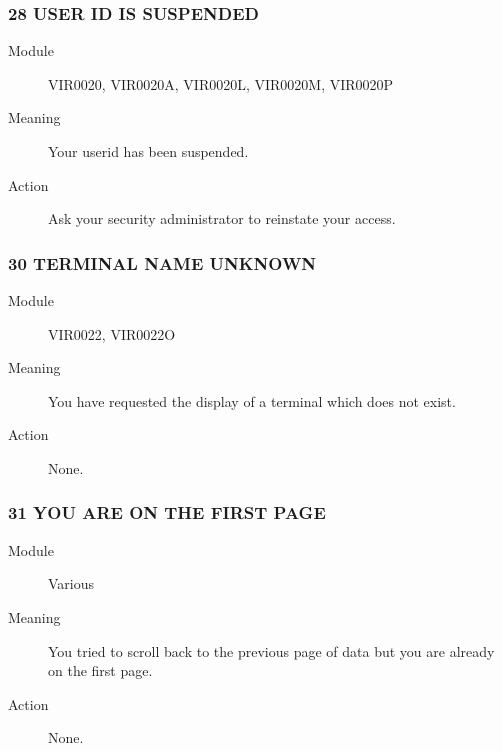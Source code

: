 \documentclass[letterpaper,10pt,english]{sphinxmanual}
\begin{document}
\subsubsection{28 USER ID IS SUSPENDED}
\label{\detokenize{messages:user-id-is-suspended}}\begin{description}
\item[{Module}] \leavevmode
VIR0020, VIR0020A, VIR0020L, VIR0020M, VIR0020P

\item[{Meaning}] \leavevmode
Your userid has been suspended.

\item[{Action}] \leavevmode
Ask your security administrator to reinstate your access.

\end{description}


\subsubsection{30 TERMINAL NAME UNKNOWN}
\label{\detokenize{messages:terminal-name-unknown}}\begin{description}
\item[{Module}] \leavevmode
VIR0022, VIR0022O

\item[{Meaning}] \leavevmode
You have requested the display of a terminal which does not exist.

\item[{Action}] \leavevmode
None.

\end{description}


\subsubsection{31 YOU ARE ON THE FIRST PAGE}
\label{\detokenize{messages:you-are-on-the-first-page}}\begin{description}
\item[{Module}] \leavevmode
Various

\item[{Meaning}] \leavevmode
You tried to scroll back to the previous page of data but you are already on the first page.

\item[{Action}] \leavevmode
None.

\end{description}
\end{document}
